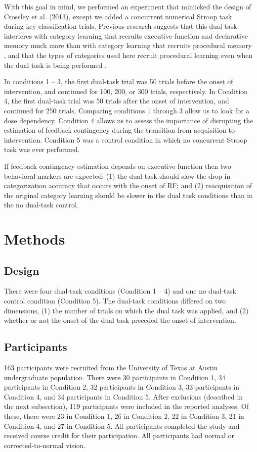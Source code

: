 \documentclass[apacite,draftfirst,man]{apa6}
\begin{document}
With this goal in mind, we performed an experiment that mimicked the design of
Crossley et al. (2013), except we added a concurrent numerical Stroop task
during key classification trials. Previous research suggests that this dual task
interferes with category learning that recruits executive function and
declarative memory much more than with category learning that recruits
procedural memory \cite{WaldronAshby2001, crossley2016declarative}, and that the
types of categories used here recruit procedural learning even when the
dual task is being performed \cite{crossley2016declarative}.

In conditions 1 -- 3, the first dual-task trial was 50 trials before the onset
of intervention, and continued for 100, 200, or 300 trials, respectively. In
Condition 4, the first dual-task trial was 50 trials after the onset of
intervention, and continued for 250 trials. Comparing conditions 1 through 3
allow us to look for a dose dependency. Condition 4 allows us to assess the
importance of disrupting the estimation of feedback contingency during the
transition from acquisition to intervention. Condition 5 was a control condition
in which no concurrent Stroop task was ever performed.

If feedback contingency estimation depends on executive function then two
behavioral markers are expected: (1) the dual task should slow the drop in
categorization accuracy that occurs with the onset of RF; and (2) reacquisition
of the original category learning should be slower in the dual task conditions
than in the no dual-task control.

\section*{Methods}
\subsection*{Design} There were four dual-task conditions (Condition 1 -- 4) and
one no dual-task control condition (Condition 5). The dual-task conditions
differed on two dimensions, (1) the number of trials on which the dual task was
applied, and (2) whether or not the onset of the dual task preceded the onset of
intervention.

\subsection*{Participants} 163 participants were recruited from the University
of Texas at Austin undergraduate population. There were 30 participants in
Condition 1, 34 participants in Condition 2, 32 participants in Condition 3, 33
participants in Condition 4, and 34 participants in Condition 5. After
exclusions (described in the next subsection), 119 participants were included in
the reported analyses. Of these, there were 23 in Condition 1, 26 in Condition
2, 22 in Condition 3, 21 in Condition 4, and 27 in Condition 5. All participants
completed the study and received course credit for their participation. All
participants had normal or corrected-to-normal vision.
\end{document}
